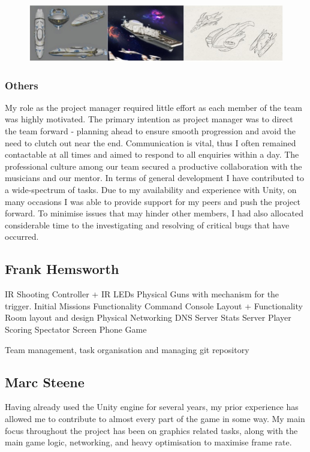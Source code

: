 \documentclass[a4paper,11pt]{article}
\begin{document}
\begin{figure}[ht]
	\centering
	\includegraphics[scale = 0.8]{images/dillon_assets}
    \label{fig:conceptart}
\end{figure}
\subsubsection{Others}

My role as the project manager required little effort as each member of the team was highly motivated. The primary intention as project manager was to direct the team forward - planning ahead to ensure smooth progression and avoid the need to clutch out near the end. Communication is vital, thus I often remained contactable at all times and aimed to respond to all enquiries within a day. The professional culture among our team secured a productive collaboration with the musicians and our mentor. In terms of general development I have contributed to a wide-spectrum of tasks. Due to my availability and experience with Unity, on many occasions I was able to provide support for my peers and push the project forward. To minimise issues that may hinder other members, I had also allocated considerable time to the investigating and resolving of critical bugs that have occurred.

\clearpage

\subsection{Frank Hemsworth}

IR Shooting Controller + IR LEDs
Physical Guns with mechanism for the trigger.
Initial Missions Functionality
Command Console Layout + Functionality
Room layout and design
Physical Networking
DNS Server
Stats Server
Player Scoring
Spectator Screen
Phone Game

Team management, task organisation and managing git repository

\clearpage

\subsection{Marc Steene}
Having already used the Unity engine for several years, my prior experience has allowed me to contribute to almost every part of the game in some way. My main focus throughout the project has been on graphics related tasks, along with the main game logic, networking, and heavy optimisation to maximise frame rate.
\end{document}
